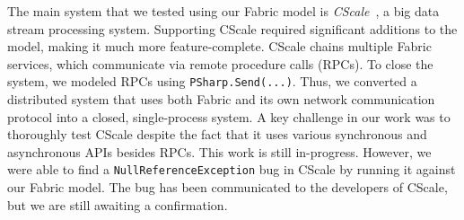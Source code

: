 The main system that we tested using our \psharp Fabric model is \emph{CScale}~\cite{faleiro2012},
a big data stream processing system.
Supporting CScale required significant additions to the model, making it much more
feature-complete.
CScale chains multiple Fabric services, which communicate via remote procedure calls (RPCs).
To close the system, we modeled RPCs 
using \texttt{PSharp.Send(...)}.
Thus, we converted a distributed system
that uses both Fabric and its own
network communication protocol
into 
a closed, single-process system. 
A key challenge in our work was to thoroughly test CScale despite the fact that it
uses various synchronous and asynchronous APIs besides RPCs.
This work is still in-progress.
However, we were able to find a \texttt{NullReferenceException}
bug in CScale by running it against our Fabric model. The bug has been
communicated to the developers of CScale, but we are still awaiting a
confirmation.
